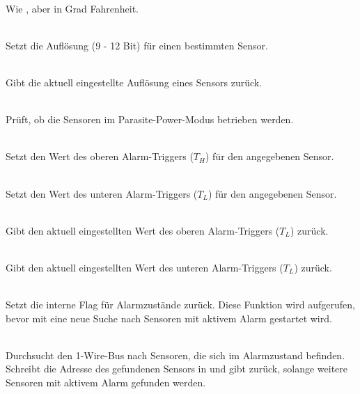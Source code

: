 \begin{description}
		\item {} \\ 
		Wie , aber in Grad Fahrenheit.
		
		\item {} \\ 
		Setzt die Auflösung (9 - 12 Bit) für einen bestimmten Sensor.
		
		\item {} \\ 
		Gibt die aktuell eingestellte Auflösung eines Sensors zurück.
		
		\item {} \\ 
		Prüft, ob die Sensoren im Parasite-Power-Modus betrieben werden.
		
		\item {} \\ 
		Setzt den Wert des oberen Alarm-Triggers ($T_H$) für den angegebenen Sensor.
		
		\item {} \\ 
		Setzt den Wert des unteren Alarm-Triggers ($T_L$) für den angegebenen Sensor.
		
		\item {} \\ 
		Gibt den aktuell eingestellten Wert des oberen Alarm-Triggers ($T_L$) zurück.
		
		\item {} \\ 
		Gibt den aktuell eingestellten Wert des unteren Alarm-Triggers ($T_L$) zurück.
		
		\item {} \\ 
		Setzt die interne Flag für Alarmzustände zurück. Diese Funktion wird aufgerufen, bevor mit  eine neue Suche nach Sensoren mit aktivem Alarm gestartet wird.
		
		\item {} \\ 
		Durchsucht den 1-Wire-Bus nach Sensoren, die sich im Alarmzustand befinden. Schreibt die Adresse des gefundenen Sensors in  und gibt  zurück, solange weitere Sensoren mit aktivem Alarm gefunden werden.
		
		
	\end{description}



